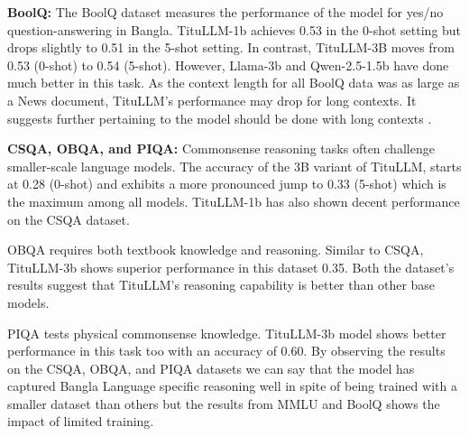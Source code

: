 
\noindent  \textbf{BoolQ:} The BoolQ dataset measures the performance of the model for yes/no question-answering in Bangla. TituLLM-1b achieves 0.53 in the 0-shot setting but drops slightly to 0.51 in the 5-shot setting. In contrast, TituLLM-3B moves from 0.53 (0-shot) to 0.54 (5-shot). However, Llama-3b and Qwen-2.5-1.5b have done much better in this task. As the context length for all BoolQ data was as large as a News document, TituLLM's performance may drop for long contexts. It suggests further pertaining to the model should be done with long contexts \cite{chowdhery2022palmscalinglanguagemodeling,kaplan2020scalinglawsneurallanguage}.

\noindent  \textbf{CSQA, OBQA, and PIQA:} Commonsense reasoning tasks often challenge smaller-scale language models. The accuracy of the 3B variant of TituLLM, starts at 0.28 (0-shot) and exhibits a more pronounced jump to 0.33 (5-shot) which is the maximum among all models. TituLLM-1b has also shown decent performance on the CSQA dataset. 

OBQA requires both textbook knowledge and reasoning. Similar to CSQA, TituLLM-3b shows superior performance in this dataset 0.35. Both the dataset's results suggest that TituLLM's reasoning capability is better than other base models.

PIQA tests physical commonsense knowledge. TituLLM-3b model shows better performance in this task too with an accuracy of 0.60. By observing the results on the CSQA, OBQA, and PIQA datasets we can say that the model has captured Bangla Language specific reasoning well in spite of being trained with a smaller dataset than others but the results from MMLU and BoolQ shows the impact of limited training. 

